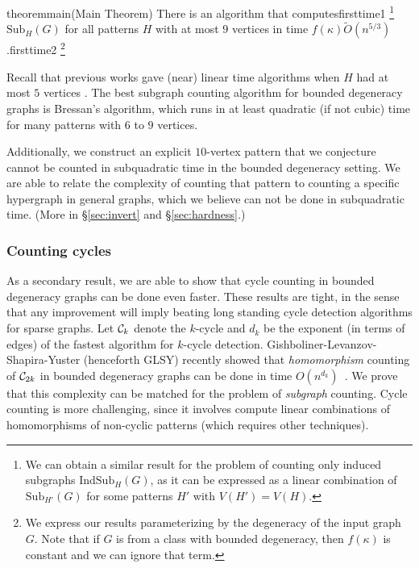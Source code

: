 \documentclass[a4paper,UKenglish,cleveref, autoref, numberwithinsect, thm-restate]{lipics-v2021}
\newcommand{\maybefootnote}[2]{\ifcsname firsttime#1\endcsname
\else
	\expandafter\gdef\csname firsttime#1\endcsname{}\footnote{#2}\fi
}
\newcommand{\cycle}[1]{\cC_{#1}}
\newcommand{\Sub}[2]{\mathrm{Sub}_{#2}(#1)}
\newcommand{\IndSub}[2]{\mathrm{IndSub}_{#2}(#1)}
\newcommand{\degen}{\kappa}
\newcommand{\cC}{{\cal C}}
\newcommand{\Sec}[1]{\S \ref{sec:#1}} \newcommand{\Eqn}[1]{\hyperref[eq:#1]{(\ref*{eq:#1})}} \newcommand{\Fig}[1]{{Fig.\,\ref{fig:#1}}} \newcommand{\Tab}[1]{\hyperref[tab:#1]{Tab.\,\ref*{tab:#1}}} \newcommand{\Table}[1]{\hyperref[tab:#1]{Table\,\ref*{tab:#1}}} \newcommand{\Thm}[1]{\hyperref[thm:#1]{Theorem\,\ref*{thm:#1}}} \newcommand{\Fact}[1]{\hyperref[fact:#1]{Fact\,\ref*{fact:#1}}} \newcommand{\Lem}[1]{\hyperref[lem:#1]{Lemma\,\ref*{lem:#1}}} \newcommand{\Prop}[1]{\hyperref[prop:#1]{Prop.~\ref*{prop:#1}}} \newcommand{\Cor}[1]{\hyperref[cor:#1]{Corollary~\ref*{cor:#1}}} \newcommand{\Conj}[1]{\hyperref[conj:#1]{Conjecture~\ref*{conj:#1}}} \newcommand{\Def}[1]{\hyperref[def:#1]{Definition~\ref*{def:#1}}} \newcommand{\Alg}[1]{\hyperref[alg:#1]{Alg.~\ref*{alg:#1}}} \newcommand{\Clm}[1]{\hyperref[clm:#1]{Claim~\ref*{clm:#1}}} \newcommand{\Obs}[1]{\hyperref[obs:#1]{Observation~\ref*{obs:#1}}} \newcommand{\Rem}[1]{\hyperref[rem:#1]{Remark~\ref*{rem:#1}}} \newcommand{\Con}[1]{\hyperref[con:#1]{Construction~\ref*{con:#1}}} \newcommand{\Step}[1]{\hyperref[step:#1]{Step~\ref*{step:#1}}} \newcommand{\Assumption}[1]{\hyperref[assm:#1]{Assumption\,\ref*{assm:#1}}}
\begin{document}
	\begin{restatable}{theorem}{main}(Main Theorem)\label{thm:main} 
		There is an algorithm that computes\maybefootnote{1}{We can obtain a similar result for the problem of counting only induced subgraphs $\IndSub{G}{H}$, as it can be expressed as a linear combination of $\Sub{G}{H'}$ for some patterns $H'$ with $V(H')=V(H)$.} $\Sub{G}{H}$ for all patterns $H$ with at most $9$ vertices
		in time $f(\degen) \tilde{O}(n^{5/3})$.\maybefootnote{2}{We express our results parameterizing by the degeneracy of the input graph $G$. Note that if $G$ is from a class with bounded degeneracy, then $f(\degen)$ is constant and we can ignore that term.}
	\end{restatable}

	Recall that previous works gave (near) linear time algorithms when $H$ had at most $5$ vertices \cite{BePaSe20}. The best subgraph counting algorithm for bounded degeneracy graphs is Bressan's algorithm, which runs in at least quadratic (if not cubic) time for many patterns with $6$ to $9$ vertices.
	
    Additionally, we construct an explicit $10$-vertex pattern that we conjecture cannot be counted in subquadratic time in the bounded degeneracy setting. We are able to relate the complexity of counting that pattern to counting a specific hypergraph in general graphs, which we believe can not be done in subquadratic time. (More in \Sec{invert} and \Sec{hardness}.)
	
	\subsubsection{Counting cycles}

	As a secondary result, we are able to show that cycle counting in bounded degeneracy graphs can be done even faster. These results are tight, in the sense that any improvement will imply beating long
    standing cycle detection algorithms for sparse graphs. Let $\cycle{k}$ denote the $k$-cycle and $d_k$ be the exponent (in terms of edges) of the fastest algorithm for $k$-cycle detection. 
    Gishboliner-Levanzov-Shapira-Yuster (henceforth GLSY) recently showed that \emph{homomorphism} counting of $\cycle{2k}$ in bounded degeneracy graphs can be done in time $O(n^{d_k})$~\cite{GiLeSh+23}. 
    We prove that this complexity can be matched for the problem of \emph{subgraph} counting. Cycle counting is more challenging, since it involves compute linear combinations
    of homomorphisms of non-cyclic patterns (which requires other techniques).
	
\end{document}
